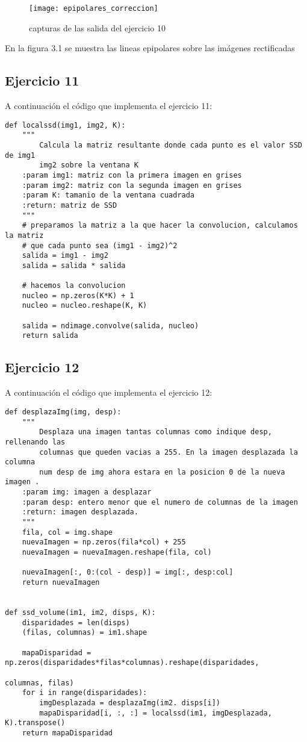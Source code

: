 \documentclass[paper=a4, fontsize=11pt]{scrartcl} %
\numberwithin{equation}{section} %
\numberwithin{figure}{section} %
\numberwithin{table}{section} %
\begin{document}
\begin{figure}
	\centering
	\texttt{[image: epipolares\_correccion]}
	\caption{capturas de las salida del ejercicio 10}
	\label{fig:fig}
\end{figure}

En la figura 3.1 se muestra las lineas epipolares sobre las imágenes rectificadas
\subsection{Ejercicio 11}

A continuación el código que implementa el ejercicio 11:

\begin{lstlisting}
def localssd(img1, img2, K):
    """
        Calcula la matriz resultante donde cada punto es el valor SSD de img1 
        img2 sobre la ventana K
    :param img1: matriz con la primera imagen en grises
    :param img2: matriz con la segunda imagen en grises
    :param K: tamanio de la ventana cuadrada
    :return: matriz de SSD
    """
    # preparamos la matriz a la que hacer la convolucion, calculamos la matriz 
    # que cada punto sea (img1 - img2)^2
    salida = img1 - img2
    salida = salida * salida

    # hacemos la convolucion
    nucleo = np.zeros(K*K) + 1
    nucleo = nucleo.reshape(K, K)

    salida = ndimage.convolve(salida, nucleo)
    return salida
\end{lstlisting}

\subsection{Ejercicio 12}

A continuación el código que implementa el ejercicio 12:

\begin{lstlisting}
def desplazaImg(img, desp):
    """
        Desplaza una imagen tantas columnas como indique desp, rellenando las 
        columnas que queden vacias a 255. En la imagen desplazada la columna 
        num desp de img ahora estara en la posicion 0 de la nueva imagen .
    :param img: imagen a desplazar
    :param desp: entero menor que el numero de columnas de la imagen
    :return: imagen desplazada.
    """
    fila, col = img.shape
    nuevaImagen = np.zeros(fila*col) + 255
    nuevaImagen = nuevaImagen.reshape(fila, col)

    nuevaImagen[:, 0:(col - desp)] = img[:, desp:col]
    return nuevaImagen


def ssd_volume(im1, im2, disps, K):
    disparidades = len(disps)
    (filas, columnas) = im1.shape

    mapaDisparidad = np.zeros(disparidades*filas*columnas).reshape(disparidades, 
    															columnas, filas)
    for i in range(disparidades):
        imgDesplazada = desplazaImg(im2. disps[i])
        mapaDisparidad[i, :, :] = localssd(im1, imgDesplazada, K).transpose()
    return mapaDisparidad
\end{lstlisting}
\end{document}
